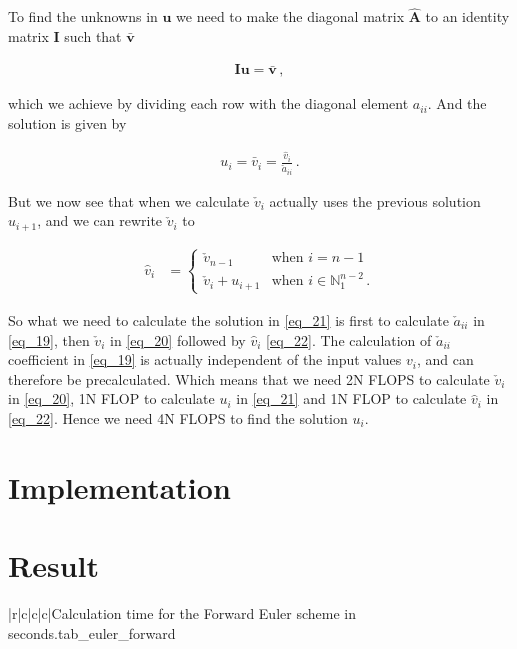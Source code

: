 \documentclass[11pt,english,a4paper]{article}
\begin{document}
\begin{flushleft}
To find the unknowns in $\textbf{u}$ we need to make the diagonal matrix $\hat{\textbf{A}}$ to an identity matrix $\textbf{I}$ such that $\bar{\textbf{v}}$

\begin{align*}
\textbf{I}\textbf{u} = \bar{\textbf{v}}\,,
\end{align*}

which we achieve by dividing each row with the diagonal element $a_{ii}$. And the solution is given by

\begin{align}
u_i = \bar{v}_i = \frac{\hat{v}_i}{\check{a}_{ii}} \,.
\label{eq_21}
\end{align}

But we now see that when we calculate $\check{v}_i$ actually uses the previous solution $u_{i+1}$, and we can rewrite $\check{v}_i$ to

\begin{align}
\hat{v}_i &= \begin{cases} \check{v}_{n-1} & \text{when $i=n-1$} \\ \check{v}_i + u_{i+1} & \text{when $i\in\mathbb{N}_1^{n-2}$}\,. \end{cases}
\label{eq_22}
\end{align}

So what we need to calculate the solution in \eqref{eq_21} is first to calculate $\check{a}_{ii}$ in \eqref{eq_19}, then $\check{v}_i$ in \eqref{eq_20} followed by $\hat{v}_i$ \eqref{eq_22}. The calculation of $\check{a}_{ii}$ coefficient in \eqref{eq_19} is actually independent of the input values $v_i$, and can therefore be precalculated. Which means that we need 2N FLOPS to calculate $\check{v}_i$ in \eqref{eq_20}, 1N FLOP to calculate $u_i$ in \eqref{eq_21} and 1N FLOP to calculate $\hat{v}_i$ in \eqref{eq_22}. Hence we need 4N FLOPS to find the solution $u_i$.

\section{Implementation}

\section{Result}

\begin{tabell}{|r|c|c|c|}{\small}{}{}{Calculation time for the Forward Euler scheme in seconds.}{tab_euler_forward}
\end{tabell}


\end{flushleft}
\end{document}
